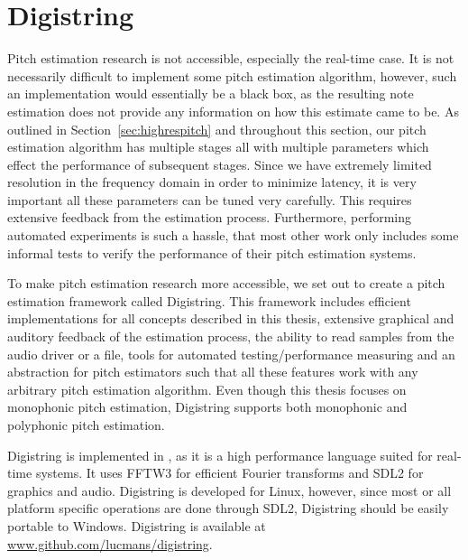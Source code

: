\documentclass[10pt,twocolumn]{article}
\begin{document}
\section{Digistring}
%
Pitch estimation research is not accessible, especially the real-time case. It is not necessarily difficult to implement some pitch estimation algorithm, however, such an implementation would essentially be a black box, as the resulting note estimation does not provide any information on how this estimate came to be. As outlined in Section~\ref{sec:highrespitch} and throughout this section, our pitch estimation algorithm has multiple stages all with multiple parameters which effect the performance of subsequent stages. Since we have extremely limited resolution in the frequency domain in order to minimize latency, it is very important all these parameters can be tuned very carefully. This requires extensive feedback from the estimation process. Furthermore, performing automated experiments is such a hassle, that most other work only includes some informal tests to verify the performance of their pitch estimation systems.

To make pitch estimation research more accessible, we set out to create a pitch estimation framework called Digistring. This framework includes efficient implementations for all concepts described in this thesis, extensive graphical and auditory feedback of the estimation process, the ability to read samples from the audio driver or a file, tools for automated testing/performance measuring and an abstraction for pitch estimators such that all these features work with any arbitrary pitch estimation algorithm. Even though this thesis focuses on monophonic pitch estimation, Digistring supports both monophonic and polyphonic pitch estimation.

Digistring is implemented in \cpluspluslogo, as it is a high performance language suited for real-time systems. It uses FFTW3 for efficient Fourier transforms and SDL2 for graphics and audio. Digistring is developed for Linux, however, since most or all platform specific operations are done through SDL2, Digistring should be easily portable to Windows. Digistring is available at \url{www.github.com/lucmans/digistring}.
\end{document}
